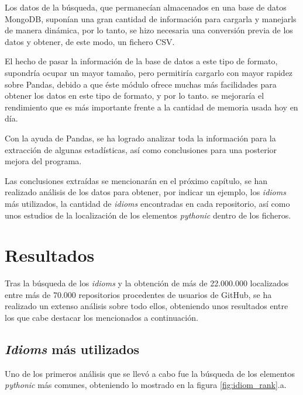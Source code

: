 \documentclass[a4paper, 12pt]{book}
\begin{document}
Los datos de la búsqueda, que permanecían almacenados en una base de datos MongoDB, suponían una gran cantidad de información para cargarla y manejarls de manera dinámica, por lo tanto, se hizo necesaria una conversión previa de los datos y obtener, de este modo, un fichero CSV.

El hecho de pasar la información de la base de datos a este tipo de formato, supondría ocupar un mayor tamaño, pero permitiría cargarlo con mayor rapidez sobre Pandas, debido a que éste módulo ofrece muchas más facilidades para obtener los datos en este tipo de formato, y por lo tanto. se mejoraría el rendimiento que es más importante frente a la cantidad de memoria usada hoy en día.

Con la ayuda de Pandas, se ha logrado analizar toda la información para la extracción de algunas estadísticas, así como conclusiones para una posterior mejora del programa.

Las conclusiones extraídas se mencionarán en el próximo capítulo, se han realizado análisis de los datos para obtener, por indicar un ejemplo, los \textit{idioms} más utilizados, la cantidad de \textit{idioms} encontradas en cada repositorio, así como unos estudios de la localización de los elementos \textit{pythonic} dentro de los ficheros.


\cleardoublepage
\chapter{Resultados}
\label{chap:results}

Tras la búsqueda de los \textit{idioms} y la obtención de más de 22.000.000 localizados entre más de 70.000 repositorios procedentes de usuarios de GitHub, se ha realizado un extenso análisis sobre todo ellos, obteniendo unos resultados entre los que cabe destacar los mencionados a continuación.




\section{\textit{Idioms} más utilizados}
\label{sec:idioms_ranking}
Uno de los primeros análisis que se llevó a cabo fue la búsqueda de los elementos \textit{pythonic} más comunes, obteniendo lo mostrado en la figura \ref{fig:idiom_rank}.a.
\end{document}

